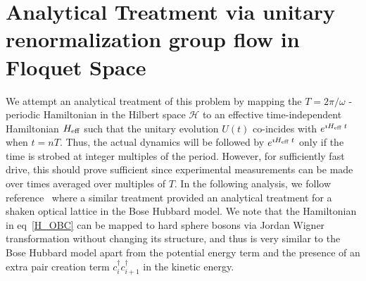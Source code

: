 \documentclass[a4paper,10pt]{article}
\begin{document}
\section{\sc Analytical Treatment via unitary renormalization group flow in Floquet Space}
\label{sec:unitary:flows}
We attempt an analytical treatment of this problem by mapping the $T=2\pi/\omega$ - periodic Hamiltonian in the Hilbert space $\mathcal{H}$ to an effective time-independent Hamiltonian $H_{\rm eff}$ such that the unitary evolution $U(t)$ co-incides with $e^{\imath H_{\rm eff}\;t}$ when $t=nT$. Thus, the actual dynamics will be followed by $e^{\imath H_{\rm eff}\;t}$ only if the time is strobed at integer multiples of the period. However, for sufficiently fast drive, this should prove sufficient since experimental measurements can be made over times averaged over multiples of $T$. In the following analysis, we follow reference~\cite{unitaryflow} where a similar treatment provided an analytical treatment for a shaken optical lattice in the Bose Hubbard model. We note that the Hamiltonian in eq~\ref{H_OBC} can be mapped to hard sphere bosons via Jordan Wigner transformation without changing its structure, and thus is very similar to the Bose Hubbard model apart from the potential energy term and the presence of 
an extra pair creation term $c^\dagger_ic^\dagger_{i+1}$ in the kinetic energy.
\end{document}
